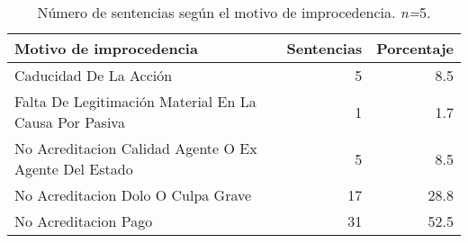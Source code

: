 \begin{table}[H]
\centering
\caption{Número de sentencias según el motivo de improcedencia. \textit{n=}5.} 
\label{tab:improcedencia}
\begin{tabular}{lrr}
  \hline
Motivo de improcedencia & Sentencias & Porcentaje \\ 
  \hline
Caducidad De La Acción &  5 & 8.5 \\ 
  Falta De Legitimación Material En La Causa Por Pasiva &  1 & 1.7 \\ 
  No Acreditacion Calidad Agente O Ex Agente Del Estado &  5 & 8.5 \\ 
  No Acreditacion Dolo O Culpa Grave & 17 & 28.8 \\ 
  No Acreditacion Pago & 31 & 52.5 \\ 
   \hline
\end{tabular}
\end{table}
